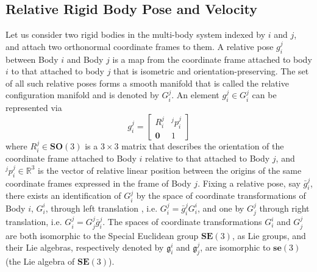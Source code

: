 \documentclass[lettersize,journal]{IEEEtran}
\def \SE {\textbf{SE}(3)}
\def \SO {\textbf{SO}(3)}
\def \se {\textbf{se}(3)}
\def \R  {\mathbb{R}}
\def \g  {\mathfrak{g}}
\begin{document}
\subsection{Relative Rigid Body Pose and Velocity}
\label{rigidbodykinematics}
Let us consider two rigid bodies in the multi-body system indexed by $i$ and $j$, and attach two orthonormal coordinate frames to them. A relative pose $g^j_i$ between Body $i$ and Body $j$ is a map from the coordinate frame attached to body $i$ to that attached to body $j$ that is isometric and orientation-preserving. The set of all such relative poses forms a smooth manifold that is called the relative configuration manifold and is denoted by $G^j_i$. An element $g^j_i\in G^j_i$ can be represented via %
\begin{equation}
    g^j_i=\begin{bmatrix}R^j_i & ^jp^j_i\\\boldsymbol{0} &1\end{bmatrix} 
\end{equation}
where ${R^j_i} \in \SO$ is a ${3 \times 3}$ matrix that describes the orientation of the coordinate frame attached to Body $i$ relative to that attached to Body $j$, and $^jp^j_i \in \R^3$ is the vector of relative linear position between the origins of the same coordinate frames expressed in the frame of Body $j$. %
Fixing a relative pose, say $\bar{g}^j_i$, there exists an identification of $G^j_i$ by the space of coordinate transformations of Body $i$, $G^i_i$, through left translation , i.e. $G^j_i={\bar{g}^j_i}G^i_i$, and one by $G^j_j$ through right translation, i.e. $G^j_i=G^j_j{\bar{g}^j_i}$. The spaces of coordinate transformations $G^i_i$ and $G^j_j$ are both isomorphic to the Special Euclidean group $\SE$, as Lie groups, and their Lie algebras, respectively denoted by $\g_i^i$ and $\g_j^j$, are isomorphic to $\se$ (the Lie algebra of $\SE$). %
\label{difkinrigid}
\end{document}
